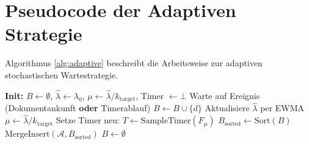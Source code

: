 ﻿\documentclass[12pt, a4paper]{article}
\begin{document}
\section{Pseudocode der Adaptiven Strategie}\label{app:adaptive}
Algorithmus \ref{alg:adaptive} beschreibt die Arbeitsweise zur adaptiven stochastischen Wartestrategie.
\begin{algorithm}[H]
\caption{Adaptive stochastische Wartestrategie $\mathcal{W}_{\mathrm{adapt}}$}
\label{alg:adaptive}
\begin{algorithmic}[1]
\State \textbf{Init:} $B \gets \emptyset$, $\hat\lambda \gets \lambda_0$,
       $\mu \gets \hat\lambda / k_{\mathrm{target}}$, Timer $\gets \bot$
\Repeat
  \State Warte auf Ereignis (Dokumentankunft \textbf{oder} Timerablauf)
    \State $B \gets B \cup \{d\}$
    \State Aktualisiere $\hat\lambda$ per EWMA
    \State $\mu \gets \hat\lambda / k_{\mathrm{target}}$
    \State Setze Timer neu: $T \gets \mathrm{SampleTimer}(F_\mu)$
      \State $B_{\mathrm{sorted}} \gets \mathrm{Sort}(B)$
      \State $\mathrm{MergeInsert}(\mathcal{A}, B_{\mathrm{sorted}})$
      \State $B \gets \emptyset$
    \EndIf
  \EndIf
{}
\end{algorithmic}
\end{algorithm}
\end{document}
